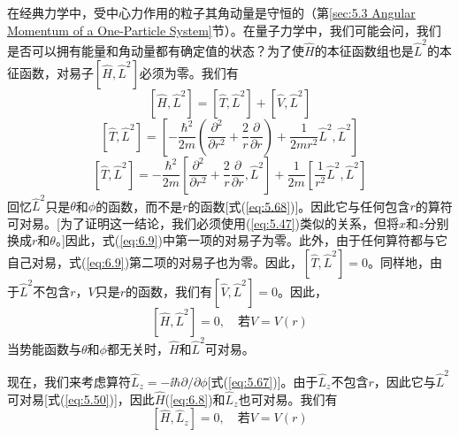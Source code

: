     在经典力学中，受中心力作用的粒子其角动量是守恒的（第\ref{sec:5.3 Angular Momentum of a One-Particle System}节）。在量子力学中，我们可能会问，我们是否可以拥有能量和角动量都有确定值的状态？为了使$\hat{H}$的本征函数组也是$\hat{L}^2$的本征函数，对易子$\left[\hat{H},\hat{L}^2\right]$必须为零。我们有
    \begin{equation*}
        \left[\hat{H},\hat{L}^2\right] = \left[\hat{T},\hat{L}^2\right] + \left[\hat{V},\hat{L}^2\right]
    \end{equation*}
    \begin{equation*}
        \left[\hat{T}, \hat{L}^2\right] = \left[-\frac{\hbar^2}{2m}\left(\frac{\partial ^2}{\partial r^2} + \frac{2}{r}\frac{\partial}{\partial r}\right) + \frac{1}{2mr^2}\hat{L}^2, \hat{L}^2\right]
    \end{equation*}
    \begin{equation}
        \left[\hat{T},\hat{L}^2\right] = -\frac{\hbar^2}{2m}\left[\frac{\partial^2}{\partial r^2} + \frac{2}{r}\frac{\partial}{\partial r}, \hat{L}^2\right] + \frac{1}{2m}\left[\frac{1}{r^2}\hat{L}^2, \hat{L}^2\right]
        \label{eq:6.9}
    \end{equation}
    回忆$\hat{L}^2$只是$\theta$和$\phi$的函数，而不是$r$的函数[式(\ref{eq:5.68})]。因此它与任何包含$r$的算符可对易。[为了证明这一结论，我们必须使用(\ref{eq:5.47})类似的关系，但将$x$和$z$分别换成$r$和$\theta$。]因此，式(\ref{eq:6.9})中第一项的对易子为零。此外，由于任何算符都与它自己对易，式(\ref{eq:6.9})第二项的对易子也为零。因此，$\left[\hat{T},\hat{L}^2\right] = 0$。同样地，由于$\hat{L}^2$不包含$r$，$V$只是$r$的函数，我们有$\left[\hat{V},\hat{L}^2\right] = 0$。因此，
    \begin{equation}
        \left[\hat{H},\hat{L}^2\right] = 0, \quad \text{若} V = V\left(r\right)
        \label{eq:6.10}
    \end{equation}
    当势能函数与$\theta$和$\phi$都无关时，$\hat{H}$和$\hat{L}^2$可对易。

    现在，我们来考虑算符$\hat{L}_z = -\ii \hbar\partial/\partial\phi$[式(\ref{eq:5.67})]。由于$\hat{L}_z$不包含$r$，因此它与$\hat{L}^2$可对易[式(\ref{eq:5.50})]，因此$\hat{H}$(\ref{eq:6.8})和$\hat{L}_z$也可对易。我们有
    \begin{equation}
        \left[\hat{H}, \hat{L}_z\right] = 0, \quad \text{若} V = V\left(r\right)
        \label{eq:6.11}
    \end{equation}

